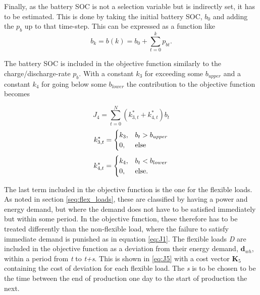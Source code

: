 Finally, as the battery SOC is not a selection variable but is indirectly set, it has to be estimated. This is done by taking the initial battery SOC, $b_0$ and adding the $p_b$ up to that time-step. This can be expressed as a function like
\begin{equation}
    b_k = b(k) = b_0 + \sum_{t=0}^{k}{p_{bt}} .
\end{equation}

The battery SOC is included in the objective function similarly to the charge/discharge-rate $p_b$. With a constant $k_3$ for exceeding some $b_{upper}$ and a constant $k_4$ for going below some $b_{lower}$ the contribution to the objective function becomes

\begin{equation}
    J_4 = \sum_{t=0}^{N}{(k_{3,t}^*+k_{4,t}^*)b_t }
\end{equation}
\begin{equation}
    k_{3,t}^* =  \begin{cases}
            k_3,& b_{t}>b_{upper}\\
            0, & \text{else}
            \end{cases}
            \notag
\end{equation}
\begin{equation}
    k_{4,t}^* =  \begin{cases}
            k_4,& b_{t}<b_{lower}\\
            0, & \text{else}.
            \end{cases}
            \notag
\end{equation}

The last term included in the objective function is the one for the flexible loads. As noted in section \ref{seq:flex_loads}, these are classified by having a power and energy demand, but where the demand does not have to be satisfied immediately but within some period. In the objective function, these therefore has to be treated differently than the non-flexible load, where the failure to satisfy immediate demand is punished as in equation \ref{eq:J1}. The flexible loads \textit{D} are included in the objective function as a deviation from their energy demand, $\mathbf{d}_{wh}$, within a period from \textit{t} to \textit{t+s}. This is shown in \ref{eq:J5} with a cost vector $\mathbf{K}_5$ containing the cost of deviation for each flexible load. The \textit{s} is to be chosen to be the time between the end of production one day to the start of production the next.


